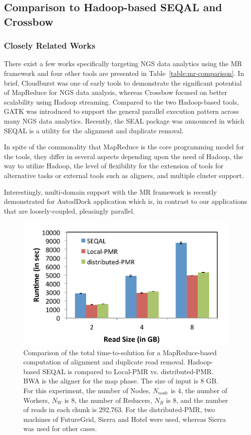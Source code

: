 \documentclass{sig-alternate}
\begin{document}
\subsection{Comparison to Hadoop-based SEQAL and Crossbow}
\subsubsection{Closely Related Works}
There exist a few works specifically targeting NGS data analytics using the MR framework and four other tools are presented in Table~\ref{table:mr-comparison}.  In brief, Cloudburst was one of early tools to demonstrate the significant potential of MapReduce for NGS data analysis, whereas Crossbow focused on better scalability using Hadoop streaming.  Compared to the two Hadoop-based tools, GATK was introduced to support the general parallel execution pattern across many NGS data analytics.  Recently, the SEAL package was announced in which SEQAL is a utility for the alignment and duplicate removal.   

In spite of the commonality that MapReduce is the core programming model for the tools, they differ in several aspects depending upon the need of Hadoop, the way to utilize Hadoop, the level of flexibility for the extension of tools for alternative tasks or external tools such as aligners, and multiple cluster support.

Interestingly, multi-domain support with the MR framework is recently demonstrated for AutodDock application which is, in contrast to our applications that are loosely-coupled, pleasingly parallel.\cite{ecmls11-mr-autodock}

\begin{figure}
 \centering
\includegraphics[scale=0.50]{figures/seqalvslocalpmr.pdf}

\caption{\small Comparison of the total time-to-solution for a MapReduce-based computation of alignment and duplicate read removal.  Hadoop-based SEQAL is compared to Local-PMR vs. distributed-PMR.  BWA is the aligner for the map phase.  The size of input is 8 GB.  For this experiment, the number of Nodes, $N_{node}$ is 4, the number of Workers, $N_W$ is 8, the number of Reducers, $N_R$ is 8, and the number of reads in each chunk is 292,763. For the distributed-PMR, two machines of FutureGrid, Sierra and Hotel were used, whereas Sierra was used for other cases.}

  \label{fig:comp_with_seqal_1} 
\end{figure}
\end{document}
